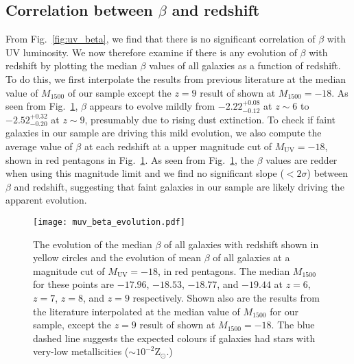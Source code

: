 \documentclass[twocolumn]{aastex63}
\begin{document}
\subsection{Correlation between $\beta$ and redshift}
From Fig.~\ref{fig:uv_beta}, we find that there is no significant correlation of $\beta$ with UV luminosity. We now therefore examine if there is any evolution of $\beta$ with redshift by plotting the median $\beta$ values of all galaxies as a function of redshift. To do this, we first interpolate the results from previous literature at the median value of $M_{1500}$ of our sample except the $z = 9$ result of \citet{Dunlop2013} shown at $M_{1500}=-18$. As seen from Fig.~\ref{fig:muv_beta_evolution}, $\beta$ appears to evolve mildly from $-2.22_{-0.12}^{+0.08}$ at $z\sim6$ to $-2.52_{-0.20}^{+0.32}$ at $z\sim9$, presumably due to rising dust extinction. To check if faint galaxies in our sample are driving this mild evolution, we also compute the average value of $\beta$ at each redshift at a upper magnitude cut of $M_{\mathrm{UV}}=-18$, shown in red pentagons in Fig.~\ref{fig:muv_beta_evolution}. As seen from Fig.~\ref{fig:muv_beta_evolution}, the $\beta$ values are redder when using this magnitude limit and we find no significant slope ($<2\sigma$) between $\beta$ and redshift, suggesting that faint galaxies in our sample are likely driving the apparent evolution. 

\begin{figure}
\texttt{[image: muv\_beta\_evolution.pdf]}
\caption{The evolution of the median $\beta$ of all galaxies with redshift shown in yellow circles and the evolution of mean $\beta$ of all galaxies at a magnitude cut of $M_{\mathrm{UV}}=-18$, in red pentagons. The median $M_{\mathrm{1500}}$ for these points are $-17.96$, $-18.53$, $-18.77$, and $-19.44$ at $z=6$, $z=7$, $z=8$, and $z=9$ respectively. Shown also are the results from the literature interpolated at the median value of $M_{1500}$ for our sample, except the $z = 9$ result of \citet{Dunlop2013} shown at $M_{1500}=-18$.  The blue dashed line suggests the expected colours if galaxies had stars with very-low metallicities ($\sim10^{-2}\mathrm{Z_{\odot}}$.)}
\label{fig:muv_beta_evolution}
\end{figure}
\end{document}
